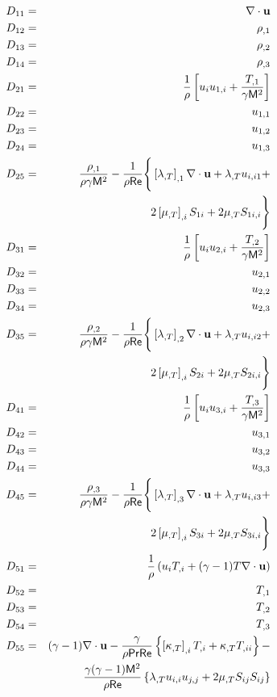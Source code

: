 \bigskip
{}
%
\begin{eqnarray} 
  D_{11} &=& \divu \\
  D_{12} &=& \rho_{,1} \\
  D_{13} &=& \rho_{,2} \\
  D_{14} &=& \rho_{,3} \\
%
  D_{21} &=& \frac{1}{\rho} \left[ u_{i}  u_{1,i} + 
              \frac{T_{,1}}{\gamma \M^2} \right]\\
  D_{22} &=&  u_{1,1}  \\
  D_{23} &=&  u_{1,2}  \\
  D_{24} &=&  u_{1,3}  \\
  D_{25} &=& \frac{\rho_{,1}}{\rho \gamma \M^2} - 
             \fact\Bigg\{ \left[\dlm\right]_{,1} \divu + \dlm  u_{i,i1} +
	     \nonumber \\
         & & 2\left[\dmu\right]_{,i}  S_{1i} + 2\dmu  S_{1i,i}\Bigg\} \\
%
  D_{31} &=& \frac{1}{\rho} \left[  u_{i}  u_{2,i} + 
             \frac{T_{,2}}{\gamma \M^2} \right]\\
  D_{32} &=&  u_{2,1}  \\
  D_{33} &=&  u_{2,2}  \\
  D_{34} &=&  u_{2,3}  \\
  D_{35} &=& \frac{\rho_{,2}}{\rho \gamma \M^2} - 
             \fact\Bigg\{ \left[\dlm\right]_{,2} \divu + \dlm  u_{i,i2} +
	     \nonumber \\
         & &  2\left[\dmu\right]_{,i}  S_{2i} + 2\dmu  S_{2i,i}\Bigg\} \\
%
  D_{41} &=& \frac{1}{\rho} \left[  u_{i}  u_{3,i} + 
             \frac{T_{,3}}{\gamma \M^2} \right]\\
  D_{42} &=&  u_{3,1}  \\
  D_{43} &=&  u_{3,2}  \\
  D_{44} &=&  u_{3,3}  \\
  D_{45} &=& \frac{\rho_{,3}}{\rho \gamma \M^2} - 
             \fact\Bigg\{ \left[\dlm\right]_{,3} \divu + \dlm  u_{i,i3} +
	     \nonumber \\
         & & 2\left[\dmu\right]_{,i}  S_{3i} + 2\dmu  S_{3i,i} \Bigg\} \\
%
  D_{51} &=& \frac{1}{\rho} \left( u_{i}  T_{,i} + 
             \gammam T \divu \right) \\
  D_{52} &=&  T_{,1} \\
  D_{53} &=&  T_{,2} \\
  D_{54} &=&  T_{,3} \\
  D_{55} &=& \gammam \divu - \frac{\gamma}{\rho\Pr\Re} \left\{ 
             \left[\dcon\right]_{,i} T_{,i} + \dcon  T_{,ii} \right\} - 
             \nonumber \\
	 & & \ff \left\{ \dlm  u_{i,i}  u_{j,j} + 
                        2 \dmu  S_{ij}  S_{ij} \right\}
\end{eqnarray}
